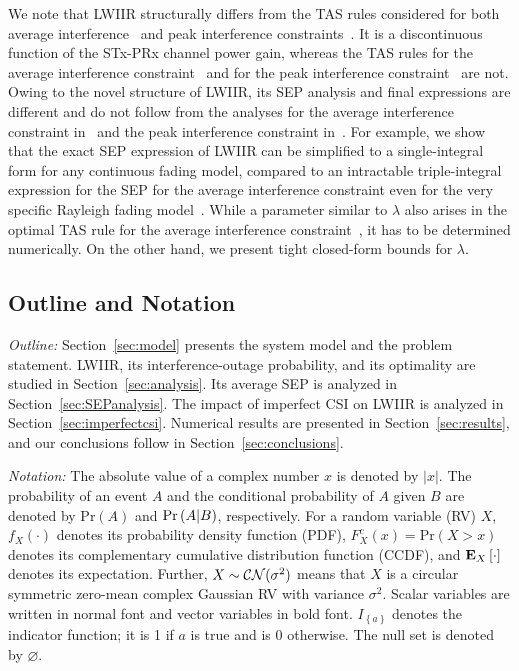 \documentclass[12pt,draftcls,peerreview,onecolumn]{IEEEtran}
\newcommand{\brac}[1]{\left({#1}\right)}
\newcommand{\cbrac}[1]{\left\{{#1}\right\}}
\newcommand{\indic}[1]{I_{\cbrac{#1}}}
\newcommand{\explow}[2]{{\bf{E}}_{#1}\left[{#2}\right]}
\newcommand{\prob}[1]{\text{Pr}\brac{#1}}
\newcommand{\given}{\arrowvert}
\newcommand{\lam}{\lambda}
\newcommand{\nullset}{\varnothing}
\begin{document}
We note that LWIIR structurally differs from the TAS rules considered for both average interference~\cite{Sarvendranath_2013_TCOM,Sarvendranath_2014_TCOM,Wang_2011_TCom} and peak interference constraints~\cite{Wang_2010_TWC,Fakhan_2014_TSP}. It is a discontinuous function of the STx-PRx channel power gain, whereas the TAS rules for the average interference constraint~\cite{Sarvendranath_2013_TCOM} and for the peak interference constraint~\cite{Fakhan_2014_TSP} are not. Owing to the novel structure of LWIIR, its SEP analysis and final expressions are different and do not follow from the analyses for the average interference constraint in~\cite{Sarvendranath_2013_TCOM} and the peak interference constraint in~\cite{Fakhan_2014_TSP}. For example, we show that the exact SEP expression of LWIIR can be simplified to a single-integral form for any continuous fading model, compared to an intractable triple-integral expression for the SEP for the average interference constraint even for the very specific Rayleigh fading model~\cite{Sarvendranath_2013_TCOM}. While a parameter similar to $\lam$ also arises in the optimal TAS rule for the average interference constraint~\cite{Sarvendranath_2013_TCOM,Sarvendranath_2014_TCOM,Wang_2011_TCom}, it has to be determined numerically. On the other hand, we present tight closed-form bounds for $\lam$.



\subsection{Outline and Notation}
{\em Outline:} Section~\ref{sec:model} presents the system model and the problem statement. LWIIR, its interference-outage probability, and its optimality are studied in Section~\ref{sec:analysis}. Its average SEP is analyzed in Section~\ref{sec:SEPanalysis}. The impact of imperfect CSI on LWIIR  is analyzed in Section~\ref{sec:imperfectcsi}. Numerical results are presented in Section~\ref{sec:results}, and our conclusions follow in Section~\ref{sec:conclusions}. %

\emph{Notation:} The absolute value of a complex number $x$ is denoted by $|x|$. The probability of an event $A$ and the conditional probability of $A$ given $B$ are denoted by $\prob{A}$ and $\prob{A \given B}$, respectively. For a random variable (RV) $X$, $f_{X}(\cdot)$ denotes its probability density function (PDF), $F_{X}^{c}(x)=\prob{X>x}$ denotes its complementary cumulative distribution function (CCDF), and $\explow{X}{\cdot}$ denotes its expectation. Further, $X \sim {\cal CN}(\sigma^2)$ means that $X$ is a circular symmetric zero-mean complex Gaussian RV with  variance $\sigma^2$.  Scalar variables are written in normal font and vector variables in bold font. $\indic{a}$ denotes the indicator function; it is 1 if $a$ is true and is 0 otherwise. The null set is denoted by $\nullset$.
\end{document}
